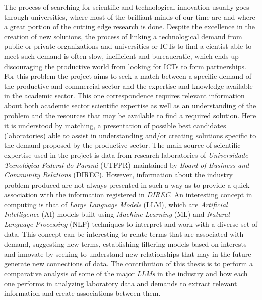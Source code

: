 \begin{abstractutfpr}
    The process of searching for scientific and technological innovation usually goes through universities, where most of the brilliant minds of our time are and where a great portion of the cutting edge research is done. Despite the excellence in the creation of new solutions, the process of linking a technological demand from public or private organizations and universities or ICTs to find a cientist able to meet such demand is often slow, inefficient and bureaucratic, which ends up discouraging the productive world from looking for ICTs to form partnerships. For this problem the project aims to seek a match between a specific demand of the productive and commercial sector and the expertise and knowledge available in the academic sector. This one correspondence requires relevant information about both academic sector scientific expertise as well as an understanding of the problem and the resources that may be available to find a required solution. Here it is understood by matching, a presentation of possible best candidates (laboratories) able to assist in understanding and/or creating solutions specific to the demand proposed by the productive sector. The main source of scientific expertise used in the project is data from research laboratories of \emph{Universidade Tecnológica Federal do Paraná} (UTFPR) maintained by \emph{Board of Business and Community Relations} (DIREC). However, information about the industry problem produced are not always presented in such a way as to provide a quick association with the information registered in \emph{DIREC}.
    An interesting concept in computing is that of \emph{Large Language Models} (LLM), which are \emph{Artificial Intelligence} (AI) models built using \emph{Machine Learning} (ML) and \emph{Natural Language Processing} (NLP) techniques to interpret and work with a diverse set of data. This concept can be interesting to relate terms that are associated with demand, suggesting new terms, establishing filtering models based on interests and innovate by seeking to understand new relationships that may in the future generate new connections of data. The contribution of this thesis is to perform a comparative analysis of some of the major \emph{LLMs} in the industry and how each one performs in analyzing laboratory data and demands to extract relevant information and create associations between them.
\end{abstractutfpr}
